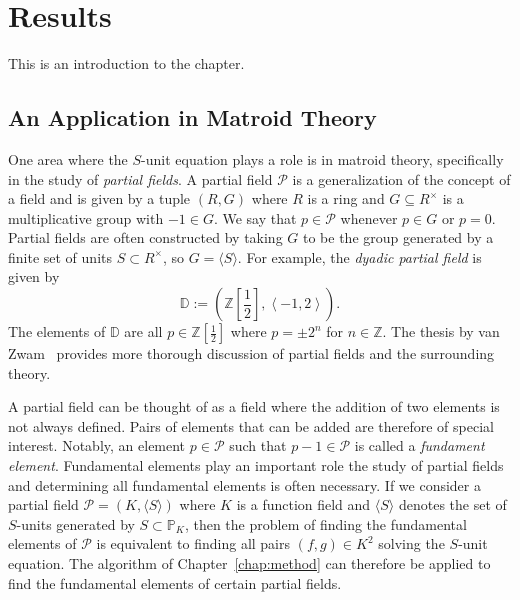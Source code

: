 
\chapter{Results}%
\label{chap:results}

This is an introduction to the chapter.

\section{An Application in Matroid Theory}%
\label{sec:an-application-in-matroid-theory}

One area where the \(S\)-unit equation plays a role is in matroid theory, specifically in the study of \textit{partial fields}. A partial field \(\mathcal{P}\) is a generalization of the concept of a field and is given by a tuple \((R, G)\) where \(R\) is a ring and \(G \subseteq R^{\times}\) is a multiplicative group with \(-1 \in G\). We say that \(p \in \mathcal{P}\) whenever \(p \in G\) or \(p = 0\). Partial fields are often constructed by taking \(G\) to be the group generated by a finite set of units \(S \subset R^{\times}\), so \(G = \langle S \rangle\). For example, the \textit{dyadic partial field} is given by
\[\mathbb{D} := \left( \mathbb{Z} \left[ \frac{1}{2} \right], \left\langle -1, 2 \right\rangle \right).\]
The elements of \(\mathbb{D}\) are all \(p \in \mathbb{Z} \left[ \frac{1}{2} \right]\) where \(p = \pm 2^{n}\) for \(n \in \mathbb{Z}\). The thesis by van Zwam~\cite{zwam-2009-partial-fields-in} provides more thorough discussion of partial fields and the surrounding theory.

A partial field can be thought of as a field where the addition of two elements is not always defined. Pairs of elements that can be added are therefore of special interest. Notably, an element \(p \in \mathcal{P}\) such that \(p - 1 \in \mathcal{P}\) is called a \textit{fundament element}. Fundamental elements play an important role the study of partial fields and determining all fundamental elements is often necessary. If we consider a partial field \(\mathcal{P} = (K, \langle S \rangle)\) where \(K\) is a function field and \(\langle S \rangle\) denotes the set of \(S\)-units generated by \(S \subset \mathbb{P}_{K}\), then the problem of finding the fundamental elements of \(\mathcal{P}\) is equivalent to finding all pairs \((f, g) \in K^{2}\) solving the \(S\)-unit equation. The algorithm of Chapter~\ref{chap:method} can therefore be applied to find the fundamental elements of certain partial fields.

